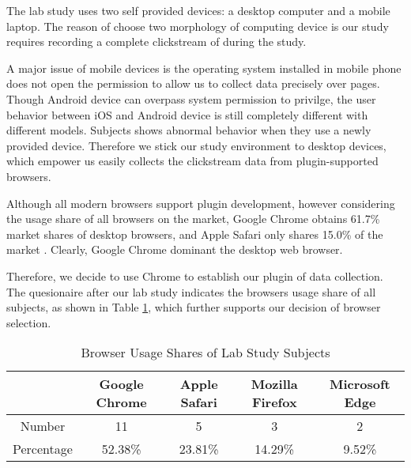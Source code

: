 The lab study uses two self provided devices: a desktop computer and a mobile laptop.
The reason of choose two morphology of computing device is our study requires recording
a complete clickstream of during the study.

A major issue of mobile devices is the operating system installed in mobile phone does not
open the permission to allow us to collect data precisely over pages. Though Android device
can overpass system permission to privilge, the user behavior between iOS and Android device
is still completely different with different models. Subjects shows abnormal behavior when they
use a newly provided device. Therefore we stick our study environment to desktop devices, 
which empower us easily collects the clickstream data from plugin-supported browsers.

Although all modern browsers support plugin development, however considering the usage share of all browsers on the market,
Google Chrome obtains 61.7\% market shares of desktop browsers, and Apple Safari only shares
15.0\% of the market \cite{wiki2018share}. Clearly, Google Chrome dominant the desktop web browser.

Therefore, we decide to use Chrome to establish our plugin of data collection.
The quesionaire after our lab study indicates the browsers usage share of all subjects, 
as shown in Table \ref{table:sharesubjects}, which further supports our decision of 
browser selection.

\begin{table}[H]
    \small
    \centering
    \setlength{\belowcaptionskip}{10pt}
    \caption{Browser Usage Shares of Lab Study Subjects}
    \begin{tabular}{ccccc}
          \toprule
        & \textbf{Google Chrome} & \textbf{Apple Safari} & \textbf{Mozilla Firefox} & \textbf{Microsoft Edge} \\
          \hline
          Number     & 11 & 5 & 3 & 2 \\
          Percentage & 52.38\% & 23.81\% & 14.29\% & 9.52\% \\
          \bottomrule
    \end{tabular}
    \label{table:sharesubjects}
\end{table}



